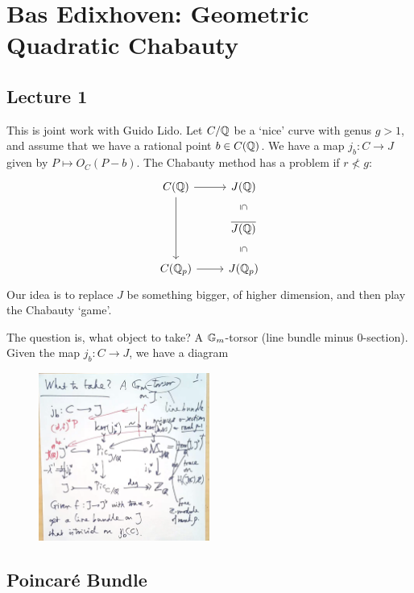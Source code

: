 \newpage
\section{Bas Edixhoven: Geometric Quadratic Chabauty}
\subsection{Lecture 1}

This is joint work with Guido Lido. Let $C/\mathbb{Q}$ be a `nice' curve with genus $g>1$, and assume that we have a rational point $b \in C(\mathbb{Q})$. We have a map $j_b: C \to J$ given by $P \mapsto O_C(P-b)$. The Chabauty method has a problem if $r \not<g$:
	\[
	\begin{tikzcd}
	C(\Q) \arrow{r} \arrow{dd} & J(\Q) \arrow[draw=none]{d}[sloped,auto=false]{\subseteq} \\
	&  \ov{J(\Q)} \arrow[draw=none]{d}[sloped,auto=false]{\subseteq} \\
	C(\Qp) \arrow{r} & J(\Qp) 
	\end{tikzcd}
	\]
Our idea is to replace $J$ be something bigger, of higher dimension, and then play the Chabauty `game'.


The question is, what object to take? A $\mathbb{G}_m$-torsor (line bundle minus 0-section). Given the map $j_b: C \to J$, we have a diagram

	\begin{figure}[!ht]
	\centering
	\includegraphics[width=0.5\textwidth]{../images/im5.png}
	\end{figure}


\subsection{Poincar\'e Bundle}

